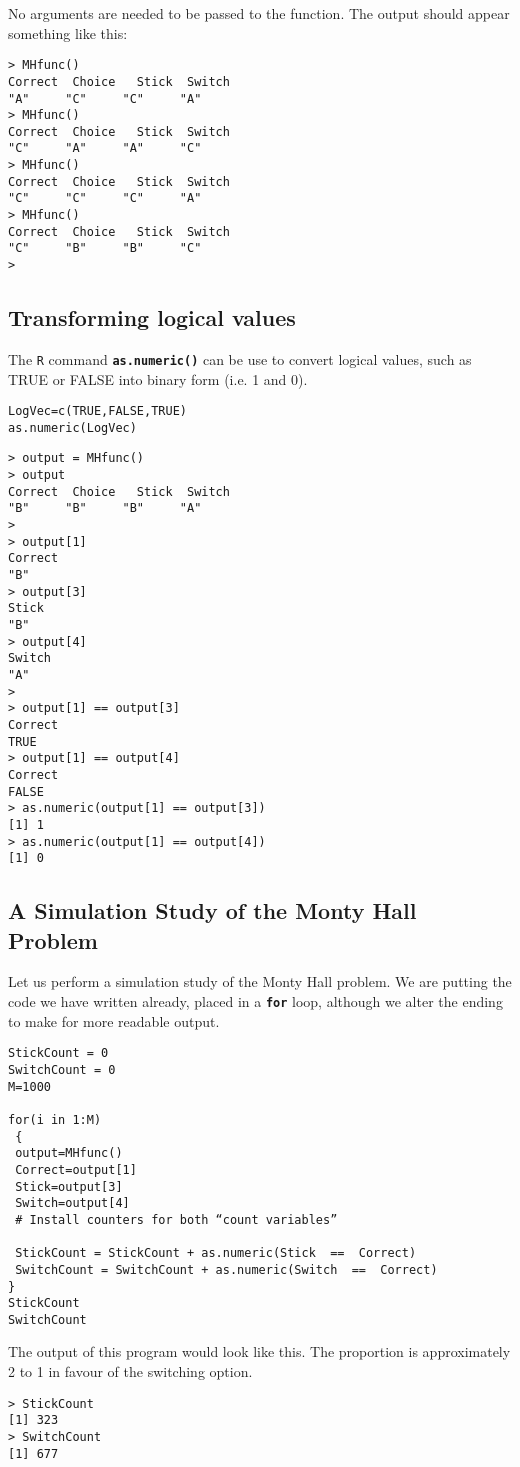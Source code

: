 \documentclass[a4paper,12pt]{article}
\begin{document}
No arguments are needed to be passed to the function. The output should appear something like this:
\begin{verbatim}
> MHfunc()
Correct  Choice   Stick  Switch 
"A"     "C"     "C"     "A" 
> MHfunc()
Correct  Choice   Stick  Switch 
"C"     "A"     "A"     "C" 
> MHfunc()
Correct  Choice   Stick  Switch 
"C"     "C"     "C"     "A" 
> MHfunc()
Correct  Choice   Stick  Switch 
"C"     "B"     "B"     "C" 
> 

\end{verbatim}

\subsection{Transforming logical values}

The \texttt{R} command \texttt{\textbf{as.numeric()}} can be use to convert logical values, such as TRUE or FALSE into binary form (i.e. 1 and 0).

\begin{framed}
\begin{verbatim}
LogVec=c(TRUE,FALSE,TRUE)
as.numeric(LogVec)
\end{verbatim} 
\end{framed}
\begin{verbatim}
> output = MHfunc()
> output
Correct  Choice   Stick  Switch 
"B"     "B"     "B"     "A" 
> 
> output[1]
Correct 
"B" 
> output[3]
Stick 
"B" 
> output[4]
Switch 
"A" 
> 
> output[1] == output[3]
Correct 
TRUE 
> output[1] == output[4]
Correct 
FALSE 
> as.numeric(output[1] == output[3])
[1] 1
> as.numeric(output[1] == output[4])
[1] 0
\end{verbatim}
\newpage
\subsection{A Simulation Study of the Monty Hall Problem}

Let us perform a simulation study of the Monty Hall problem. We are putting the code we have written already, placed in a \texttt{\textbf{for}} loop, although we alter the ending to make for more readable output.

\begin{framed}
\begin{verbatim}
StickCount = 0
SwitchCount = 0
M=1000

for(i in 1:M)
 {
 output=MHfunc()
 Correct=output[1]
 Stick=output[3]
 Switch=output[4]
 # Install counters for both “count variables”

 StickCount = StickCount + as.numeric(Stick  ==  Correct)
 SwitchCount = SwitchCount + as.numeric(Switch  ==  Correct)
}
StickCount
SwitchCount
\end{verbatim} 
\end{framed}

The output of this program would look like this. The proportion is approximately 2 to 1 in favour of the switching option.
\begin{verbatim}
> StickCount
[1] 323
> SwitchCount
[1] 677
\end{verbatim}
\end{document}
